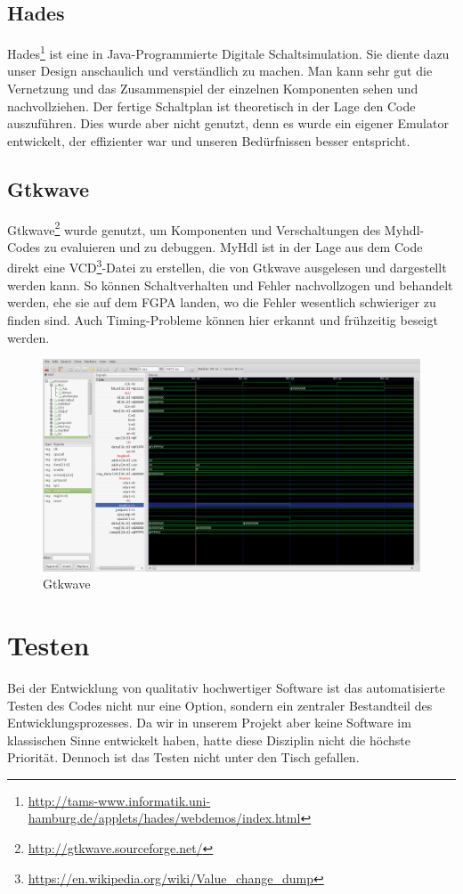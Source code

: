 \subsection{Hades}
Hades\footnote{\url{http://tams-www.informatik.uni-hamburg.de/applets/hades/webdemos/index.html}} ist eine in Java-Programmierte Digitale Schaltsimulation. Sie diente dazu unser Design anschaulich und verständlich zu machen. Man kann sehr gut die Vernetzung und das Zusammenspiel der einzelnen Komponenten sehen und nachvollziehen. Der fertige Schaltplan ist theoretisch in der Lage den Code auszuführen. Dies wurde aber nicht genutzt, denn es wurde ein eigener Emulator entwickelt, der effizienter war und unseren Bedürfnissen besser entspricht.

\subsection{Gtkwave}
Gtkwave\footnote{\url{http://gtkwave.sourceforge.net/}} wurde genutzt, um Komponenten und Verschaltungen des Myhdl-Codes zu evaluieren und zu debuggen. MyHdl ist in der Lage aus dem Code direkt eine VCD\footnote{\url{https://en.wikipedia.org/wiki/Value_change_dump}}-Datei zu erstellen, die von Gtkwave ausgelesen und dargestellt werden kann. So können Schaltverhalten und Fehler nachvollzogen und behandelt werden, ehe sie auf dem FGPA landen, wo die Fehler wesentlich schwieriger zu finden sind. Auch Timing-Probleme können hier erkannt und frühzeitig beseigt werden.
\begin{figure}[H]
\centering
\includegraphics[width=\textwidth]{images/gtkwave.png}
\caption{\label{gen:gtkwave}Gtkwave}
\end{figure}

\section{Testen}
Bei der Entwicklung von qualitativ hochwertiger Software ist das automatisierte Testen des Codes nicht nur eine Option, sondern ein zentraler Bestandteil des Entwicklungsprozesses. Da wir in unserem Projekt aber keine Software im klassischen Sinne entwickelt haben, hatte diese Disziplin nicht die höchste Priorität. Dennoch ist das Testen nicht unter den Tisch gefallen. 


